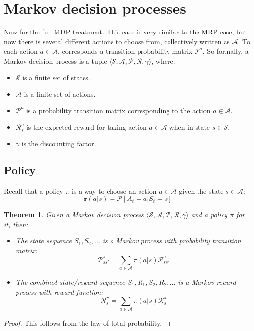 \documentclass[12pt, a4paper]{article}
\newtheorem{theorem}{Theorem}[section]
\numberwithin{equation}{section}
\begin{document}
\section{Markov decision processes}
Now for the full MDP treatment. This case is very similar to the MRP case, but now there is several different actions to choose from, collectively written as $\mathcal{A}$. To each action $a\in\mathcal{A}$, corresponds a transition probability matrix $\mathcal{P}^a$. So formally, a Markov decision process is a tuple $\langle\mathcal{S},\mathcal{A},\mathcal{P},\mathcal{R},\gamma\rangle$, where:
\begin{itemize}
\item $\mathcal{S}$ is a finite set of states.
\item $\mathcal{A}$ is a finite set of actions.
\item $\mathcal{P}^a$ is a probability transition matrix corresponding to the action $a\in\mathcal{A}$.
\item $\mathcal{R}^a_s$ is the expected reward for taking action $a\in\mathcal{A}$ when in state $s\in\mathcal{S}$.
\item $\gamma$ is the discounting factor.
\end{itemize}

\subsection{Policy}
Recall that a policy $\pi$ is a way to choose an action $a\in\mathcal{A}$ given the state $s\in\mathcal{A}$:
\begin{equation}
\pi(a|s)=\mathcal{P}[A_t=a|S_t=s]
\end{equation}

\begin{theorem}
Given a Markov decision process $\langle\mathcal{S},\mathcal{A},\mathcal{P},\mathcal{R},\gamma\rangle$ and a policy $\pi$ for it, then:
\begin{itemize}
\item The state sequence $S_1,S_2,\ldots$ is a Markov process with probability transition matrix:
\begin{equation}
\mathcal{P}^\pi_{ss'}=\sum_{a\in\mathcal{A}}\pi(a|s)\mathcal{P}^a_{ss'}
\end{equation}
\item The combined state/reward sequence $S_1,R_1,S_2,R_2,\ldots$ is a Markov reward process with reward function:
\begin{equation}
\mathcal{R}^\pi_s=\sum_{a\in\mathcal{A}}\pi(a|s)\mathcal{R}^a_s
\end{equation}
\end{itemize}
\end{theorem}
\begin{proof}
This follows from the law of total probability.
\end{proof}
\end{document}
